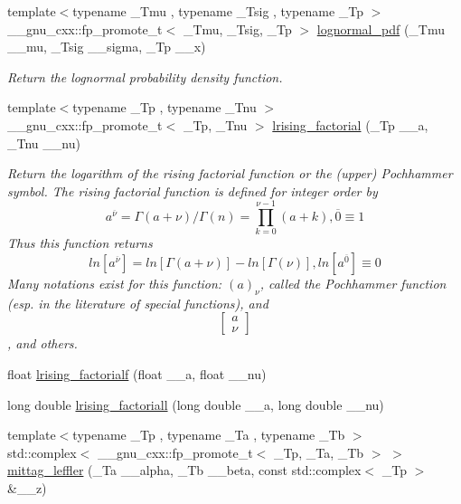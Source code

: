 \begin{DoxyCompactItemize}
{\footnotesize template$<$typename \+\_\+\+Tmu , typename \+\_\+\+Tsig , typename \+\_\+\+Tp $>$ }\\\+\_\+\+\_\+gnu\+\_\+cxx\+::fp\+\_\+promote\+\_\+t$<$ \+\_\+\+Tmu, \+\_\+\+Tsig, \+\_\+\+Tp $>$ \hyperlink{group__mathsf__gnu_gaef4db41e58e53144df2ddcc834d88e0b}{lognormal\+\_\+pdf} (\+\_\+\+Tmu \+\_\+\+\_\+mu, \+\_\+\+Tsig \+\_\+\+\_\+sigma, \+\_\+\+Tp \+\_\+\+\_\+x)
\begin{DoxyCompactList}\small\item\em Return the lognormal probability density function. \end{DoxyCompactList}\item 
{\footnotesize template$<$typename \+\_\+\+Tp , typename \+\_\+\+Tnu $>$ }\\\+\_\+\+\_\+gnu\+\_\+cxx\+::fp\+\_\+promote\+\_\+t$<$ \+\_\+\+Tp, \+\_\+\+Tnu $>$ \hyperlink{group__mathsf__gnu_ga8912b75b2f7592fb61128c766e7313b9}{lrising\+\_\+factorial} (\+\_\+\+Tp \+\_\+\+\_\+a, \+\_\+\+Tnu \+\_\+\+\_\+nu)
\begin{DoxyCompactList}\small\item\em Return the logarithm of the rising factorial function or the (upper) Pochhammer symbol. The rising factorial function is defined for integer order by \[ a^{\overline{\nu}} = \Gamma(a + \nu) / \Gamma(n) = \prod_{k=0}^{\nu-1} (a + k), \overline{0} \equiv 1 \] Thus this function returns \[ ln[a^{\overline{\nu}}] = ln[\Gamma(a + \nu)] - ln[\Gamma(\nu)], ln[a^{\overline{0}}] \equiv 0 \] Many notations exist for this function\+: $ (a)_\nu $, called the Pochhammer function (esp. in the literature of special functions), and \[ \left[ \begin{array}{c} a \\ \nu \end{array} \right] \], and others. \end{DoxyCompactList}\item 
float \hyperlink{group__mathsf__gnu_ga68c64f4e44d03b5b3f75f90dbe2e0819}{lrising\+\_\+factorialf} (float \+\_\+\+\_\+a, float \+\_\+\+\_\+nu)
\item 
long double \hyperlink{group__mathsf__gnu_ga1ac811f56f38f7ea7a1e035ec0157f6b}{lrising\+\_\+factoriall} (long double \+\_\+\+\_\+a, long double \+\_\+\+\_\+nu)
\item 
{\footnotesize template$<$typename \+\_\+\+Tp , typename \+\_\+\+Ta , typename \+\_\+\+Tb $>$ }\\std\+::complex$<$ \+\_\+\+\_\+gnu\+\_\+cxx\+::fp\+\_\+promote\+\_\+t$<$ \+\_\+\+Tp, \+\_\+\+Ta, \+\_\+\+Tb $>$ $>$ \hyperlink{group__mathsf__gnu_ga1a51079e00fbe5473d8cf9ad3304c5c6}{mittag\+\_\+leffler} (\+\_\+\+Ta \+\_\+\+\_\+alpha, \+\_\+\+Tb \+\_\+\+\_\+beta, const std\+::complex$<$ \+\_\+\+Tp $>$ \&\+\_\+\+\_\+z)

\end{DoxyCompactItemize}
